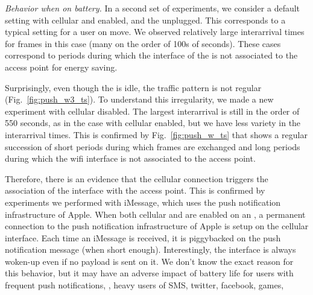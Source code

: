 

\noindent\emph{Behavior when on battery.} 
In a second set of experiments, we consider a default \iphone{}
setting with cellular and \wifi{} enabled, and the \iphone{} unplugged. This
corresponds to a typical setting for a user on move.  We observed 
relatively large interarrival times for frames in this case (many on the order of 100s of 
seconds). These cases correspond to
periods during which the \wifi interface of the \iphone{} is not
associated to the access point for energy saving. 




Surprisingly, even though the \iphone{} is idle, the traffic pattern
is not regular (Fig.~\ref{fig:push_w3_ts}). To
understand this irregularity, we made a new experiment with cellular
disabled. The largest
interarrival is still in the order of 550 seconds, as in the case with
cellular enabled, but we have less variety in the interarrival times. This
is confirmed by Fig.~\ref{fig:push_w_ts} that shows a regular
succession of short periods during which frames are exchanged and long
periods during which the wifi interface is not associated to the
access point.



Therefore, there is an evidence that the cellular connection triggers
the association of the \iphone{} \wifi interface with the access
point. This is confirmed by experiments we performed with iMessage, 
which uses the push notification infrastructure of Apple. When both
cellular and \wifi{} are enabled on an \iphone{}, a permanent connection to
the push notification infrastructure of Apple is setup on the cellular
interface. Each time an iMessage is received, it is piggybacked on the
push notification message (when short enough). Interestingly, the \wifi{}
interface is always woken-up even if no payload is sent on it. We
don't know the exact reason for this behavior, but it may have an
adverse impact of battery life for users with frequent push
notifications, \eg, heavy users of SMS, twitter, facebook, games, \etc



